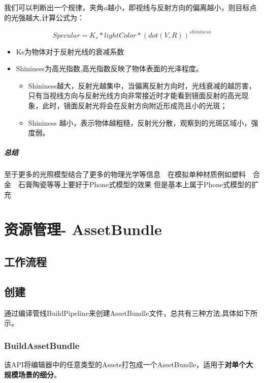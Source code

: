 \documentclass[UTF8,a4paper,12pt]{ctexbook}
\begin{document}
				我们可以判断出一个规律，夹角$a$越小，即视线与反射方向的偏离越小，则目标点的光强越大,计算公式为：
					
					$$Specular = K_s * lightColor * (dot(V,R))^{shininess}$$ 
				
					\begin{itemize}
						\item Ks为物体对于反射光线的衰减系数
						\item Shininess为高光指数,高光指数反映了物体表面的光泽程度。
						\begin{itemize}
							\item Shininess越大，反射光越集中，当偏离反射方向时，光线衰减的越厉害，只有当视线方向与反射光线方向非常接近时才能看到镜面反射的高光现象，此时，镜面反射光将会在反射方向附近形成亮且小的光斑；
							\item Shininess 越小，表示物体越粗糙，反射光分散，观察到的光斑区域小，强度弱。
						\end{itemize}
					\end{itemize}
			
			\paragraph{总结}
				至于更多的光照模型结合了更多的物理光学等信息　在模拟单种材质例如塑料　合金　石膏陶瓷等等上要好于Phone式模型的效果 但是基本上属于Phone式模型的扩充
				
				
\chapter{资源管理- AssetBundle}
	\section{工作流程}
	\section{创建}
		通过编译管线BuildPipeline来创建AssetBundle文件，总共有三种方法,具体如下所示。
		\subsection{BuildAssetBundle}
			该API将编辑器中的任意类型的Assets打包成一个AssetBundle，适用于\textbf{对单个大规模场景的细分}。
			
\end{document}
